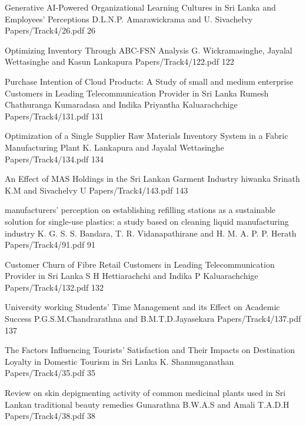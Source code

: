 




\addpaper
{Generative AI-Powered Organizational Learning Cultures in Sri Lanka and Employees' Perceptions}
{D.L.N.P. Amarawickrama and U. Sivachelvy}
{Papers/Track4/26.pdf}
{26}

\addpaper
{Optimizing Inventory Through ABC-FSN Analysis}
{G. Wickramasinghe, Jayalal Wettasinghe and Kasun Lankapura}
{Papers/Track4/122.pdf}
{122}

   \addpaper
{Purchase Intention of Cloud Products: A Study of small and medium enterprise Customers in Leading Telecommunication Provider in Sri Lanka}
 {Rumesh Chathuranga Kumaradasa and Indika Priyantha Kaluarachchige } 
 {Papers/Track4/131.pdf}
   {131}

\addpaper
{Optimization of a Single Supplier Raw Materials Inventory System in a Fabric Manufacturing Plant}
{K. Lankapura and Jayalal Wettasinghe}
{Papers/Track4/134.pdf}
{134}

\addpaper
{An Effect of MAS Holdings in the Sri Lankan Garment Industry}
{hiwanka Srinath K.M and Sivachelvy U}
{Papers/Track4/143.pdf}
{143}

   \addpaper
{manufacturers' perception on establishing
refilling stations as a sustainable solution for
single-use plastics: a study based on cleaning
liquid manufacturing industry}
 {K. G. S. S. Bandara, T. R. Vidanapathirane and H. M. A. P. P. Herath} 
 {Papers/Track4/91.pdf}
   {91}


   \addpaper
{Customer Churn of Fibre Retail Customers in Leading Telecommunication Provider in Sri Lanka}
 {S H Hettiarachchi and Indika P Kaluarachchige} 
 {Papers/Track4/132.pdf}
   {132}

   \addpaper
{University working Students' Time Management and its Effect on Academic Success}
 {P.G.S.M.Chandrarathna and B.M.T.D.Jayasekara} 
 {Papers/Track4/137.pdf}
   {137}

\addpaper
{The Factors Influencing Tourists’ Satisfaction and Their Impacts on Destination Loyalty in Domestic Tourism in Sri Lanka}
{K. Shanmuganathan}
{Papers/Track4/35.pdf}
{35}

   \addpaper
{Review on skin depigmenting activity of common medicinal plants used in Sri Lankan traditional beauty remedies}
 {Gunarathna B.W.A.S and Amali T.A.D.H} 
 {Papers/Track4/38.pdf}
   {38}

